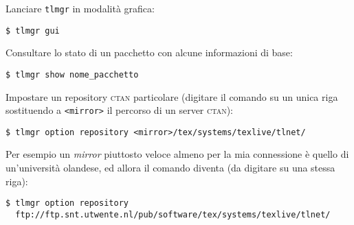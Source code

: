 Lanciare \texttt{tlmgr} in modalità grafica:
\begin{verbatim}
$ tlmgr gui
\end{verbatim}

Consultare lo stato di un pacchetto con alcune informazioni di base:
\begin{verbatim}
$ tlmgr show nome_pacchetto
\end{verbatim}

Impostare un repository \textsc{ctan} particolare (digitare il comando su un unica riga sostituendo a \texttt{<mirror>} il percorso di un server \textsc{ctan}):
\begin{verbatim}
$ tlmgr option repository <mirror>/tex/systems/texlive/tlnet/
\end{verbatim}

Per esempio un \emph{mirror} piuttosto veloce almeno per la mia connessione è quello di un'università olandese, ed allora il comando diventa (da digitare su una stessa riga):
\begin{Verbatim}[fontsize=\small]
$ tlmgr option repository
  ftp://ftp.snt.utwente.nl/pub/software/tex/systems/texlive/tlnet/
\end{Verbatim}



